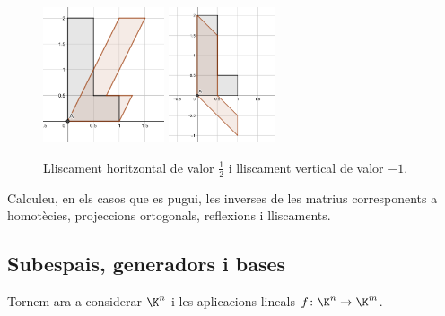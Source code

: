 \begin{figure}[ht]
    \centering
    \includegraphics[height=4cm]{hshear.png}
    \includegraphics[height=4cm]{vshear.png}
    \caption{Lliscament horitzontal de valor $\frac 1 2$ i lliscament vertical de valor $-1$.}
    \label{fig:lliscaments}
\end{figure}

\begin{exercici}
	Calculeu, en els casos que es pugui, les inverses de les matrius corresponents a homotècies, projeccions ortogonals, reflexions i lliscaments.
\end{exercici}

\subsection{Subespais, generadors i bases}
Tornem ara a considerar $\K^n$ i les aplicacions lineals $f\colon \K^n\to\K^m$.

